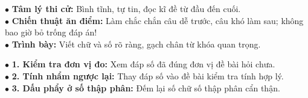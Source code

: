 \documentclass[14pt,a4paper,oneside]{extbook}
\begin{document}
\noindent
\begin{minipage}[t]{0.54\textwidth}
  \begin{tcolorbox}[
    enhanced,
    title={\footnotesize\bfseries\color{white}\faHeart\ Lời dặn dò tâm huyết từ Thầy Lĩnh},
    colback=green!3!white,
    colframe=green!60!black,
    arc=2.5mm, boxrule=0.8pt, top=1.8mm, bottom=1.8mm, left=2.2mm, right=2.2mm
  ]
    \footnotesize
    $\bullet$ \textbf{Tâm lý thi cử:} Bình tĩnh, tự tin, đọc kĩ đề từ đầu đến cuối.\\
    $\bullet$ \textbf{Chiến thuật ăn điểm:} Làm chắc chắn câu dễ trước, câu khó làm sau; không bao giờ bỏ trống đáp án!\\
    $\bullet$ \textbf{Trình bày:} Viết chữ và số rõ ràng, gạch chân từ khóa quan trọng.
  \end{tcolorbox}
\end{minipage}%
\hfill
\begin{minipage}[t]{0.44\textwidth}
  \begin{tcolorbox}[
    enhanced,
    title={\footnotesize\bfseries\color{white}\faStar\ 3 thói quen kiểm tra bài thi},
    colback=red!2!white,
    colframe=red!70!black,
    arc=2.5mm, boxrule=0.8pt, top=1.8mm, bottom=1.8mm, left=2.2mm, right=2.2mm
  ]
    \footnotesize
    $\bullet$ \textbf{1. Kiểm tra đơn vị đo:} Xem đáp số đã đúng đơn vị đề bài hỏi chưa.\\
    $\bullet$ \textbf{2. Tính nhẩm ngược lại:} Thay đáp số vào đề bài kiểm tra tính hợp lý.\\
    $\bullet$ \textbf{3. Dấu phẩy ở số thập phân:} Đếm lại số chữ số thập phân cẩn thận.
  \end{tcolorbox}
\end{minipage}
\end{document}
